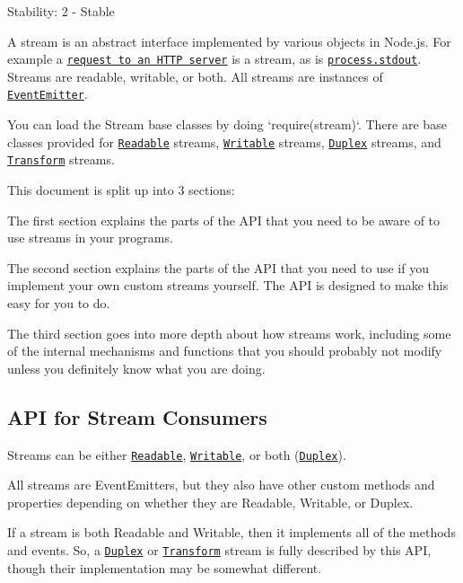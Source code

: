 Stability\+: 2 -\/ Stable

A stream is an abstract interface implemented by various objects in Node.\+js. For example a \href{https://nodejs.org/docs/v5.8.0/api/http.html#http_class_http_incomingmessage}{\tt request to an H\+T\+TP server} is a stream, as is \href{https://nodejs.org/docs/v5.8.0/api/process.html#process_process_stdout}{\tt {\ttfamily process.\+stdout}}. Streams are readable, writable, or both. All streams are instances of \href{https://nodejs.org/docs/v5.8.0/api/events.html#events_class_eventemitter}{\tt {\ttfamily Event\+Emitter}}.

You can load the Stream base classes by doing `require(\textquotesingle{}stream\textquotesingle{})`. There are base classes provided for \href{#stream_class_stream_readable}{\tt Readable} streams, \href{#stream_class_stream_writable}{\tt Writable} streams, \href{#stream_class_stream_duplex}{\tt Duplex} streams, and \href{#stream_class_stream_transform}{\tt Transform} streams.

This document is split up into 3 sections\+:


\begin{DoxyEnumerate}
\item The first section explains the parts of the A\+PI that you need to be aware of to use streams in your programs.
\item The second section explains the parts of the A\+PI that you need to use if you implement your own custom streams yourself. The A\+PI is designed to make this easy for you to do.
\item The third section goes into more depth about how streams work, including some of the internal mechanisms and functions that you should probably not modify unless you definitely know what you are doing.
\end{DoxyEnumerate}

\subsection*{A\+PI for Stream Consumers}

Streams can be either \href{#stream_class_stream_readable}{\tt Readable}, \href{#stream_class_stream_writable}{\tt Writable}, or both (\href{#stream_class_stream_duplex}{\tt Duplex}).

All streams are Event\+Emitters, but they also have other custom methods and properties depending on whether they are Readable, Writable, or Duplex.

If a stream is both Readable and Writable, then it implements all of the methods and events. So, a \href{#stream_class_stream_duplex}{\tt Duplex} or \href{#stream_class_stream_transform}{\tt Transform} stream is fully described by this A\+PI, though their implementation may be somewhat different.

